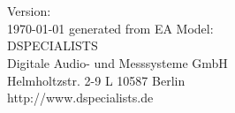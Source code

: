 \newcommand*{\Autor}{DSPECIALISTS GmbH}
\newcommand*{\Datum}{Berlin, Januar 2013}
\title{\eatexTitle}
\author{\Autor} 
\date{\Datum}

\begin{titlepage}
\thispagestyle{firststyle}
\vspace*{2cm} 


	\begin{centering}
	\def\myversion{1.0 }
	\vspace{1.5cm}
	\Huge{\textbf{\eatexDoctype}}\\
	\vspace{4cm}
	\textbf{\eatexTitle} \\
	\begin{flushright}
	\vfill
	\vfill
	\vfill
	\vfill
	\vfill
	\vfill
	\vfill
	\vfill
	\vfill
	\vfill
	\vfill
	\vfill
	\vfill
	\vfill
	\vfill
	\vfill
	\vfill
	\vfill
	\vfill
	\normalsize{Version: \eatexDocVer}\\
	\normalsize{\today}
	\vfill
	\normalsize{generated from EA Model:}\\
	\footnotesize{\it{\expandafter\expandafter\expandafter\filepath\expandafter{\eatexModelPath}}}
	\vfill
	\footnotesize{\it{\expandafter\expandafter\expandafter\filepath\expandafter{\eatexDocPath}}}
	\vfill
	\vfill
	\vfill
	\vfill
	\vfill
	\vfill
	\vfill
	\normalsize{DSPECIALISTS}\\
	\normalsize{Digitale Audio- und Messsysteme GmbH}\\
	\normalsize{Helmholtzstr. 2-9 L  10587 Berlin}\\
	\vspace{11pt}	
	\normalsize{http://www.dspecialists.de}\\
	\end{flushright}
\end{centering}
\end{titlepage}




	
